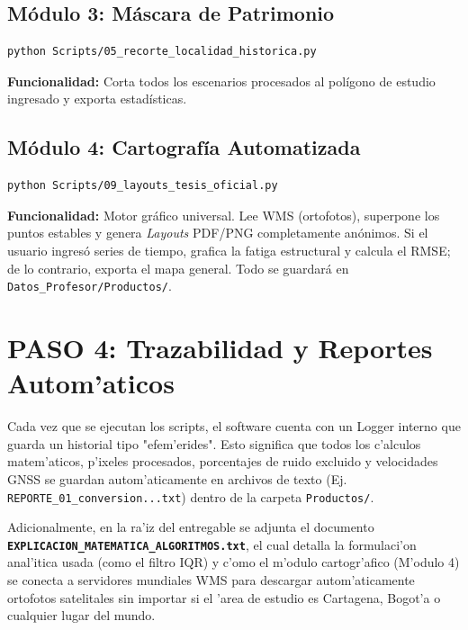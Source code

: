 ﻿\documentclass[11pt, a4paper]{article}
\begin{document}
\subsection{M\'odulo 3: M\'ascara de Patrimonio}
\begin{lstlisting}[language=bash]
python Scripts/05_recorte_localidad_historica.py
\end{lstlisting}
\textbf{Funcionalidad:} Corta todos los escenarios procesados al pol\'igono de estudio ingresado y exporta estad\'isticas.

\subsection{M\'odulo 4: Cartograf\'ia Automatizada}
\begin{lstlisting}[language=bash]
python Scripts/09_layouts_tesis_oficial.py
\end{lstlisting}
\textbf{Funcionalidad:} Motor gr\'afico universal. Lee WMS (ortofotos), superpone los puntos estables y genera \textit{Layouts} PDF/PNG completamente an\'onimos. Si el usuario ingres\'o series de tiempo, grafica la fatiga estructural y calcula el RMSE; de lo contrario, exporta el mapa general. Todo se guardar\'a en \texttt{Datos\_Profesor/Productos/}.


\section{PASO 4: Trazabilidad y Reportes Autom'aticos}
Cada vez que se ejecutan los scripts, el software cuenta con un Logger interno que guarda un historial tipo "efem'erides". Esto significa que todos los c'alculos matem'aticos, p'ixeles procesados, porcentajes de ruido excluido y velocidades GNSS se guardan autom'aticamente en archivos de texto (Ej. \texttt{REPORTE\_01\_conversion...txt}) dentro de la carpeta \texttt{Productos/}.

Adicionalmente, en la ra'iz del entregable se adjunta el documento \textbf{\texttt{EXPLICACION\_MATEMATICA\_ALGORITMOS.txt}}, el cual detalla la formulaci'on anal'itica usada (como el filtro IQR) y c'omo el m'odulo cartogr'afico (M'odulo 4) se conecta a servidores mundiales WMS para descargar autom'aticamente ortofotos satelitales sin importar si el 'area de estudio es Cartagena, Bogot'a o cualquier lugar del mundo.
\end{document}
